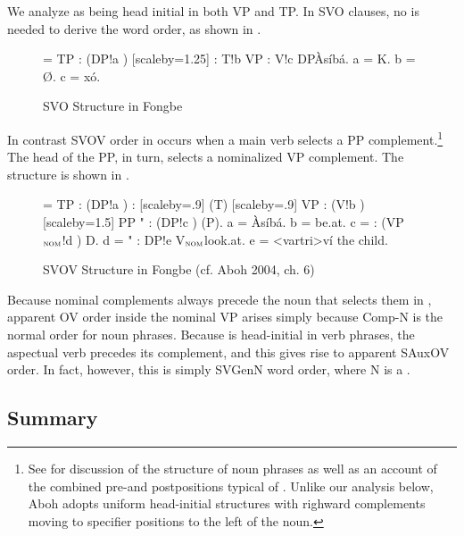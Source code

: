 \documentclass[output=paper]{LSP/langsci}
\begin{document}
We analyze  as being head initial in both VP and TP. In SVO clauses, no  is needed to derive the word order, as shown in . 

\begin{figure}
{\footnotesize \jtree[xunit=2.5em,yunit=1.25em]
\! = {TP}
: ({DP}!a ) [scaleby=1.25]
: {T}!b {VP}
: {V}!c {DP}{\`As\'ib\'a}.
\!a = {K}.
\!b = {\O{}}.
\!c = {x\'o}.
\endjtree}
\caption{SVO Structure in Fongbe}
\label{fig:sande:Fongbe-SAuxVO}
\end{figure}

In contrast SVOV order in  occurs when a main verb selects a PP complement.\footnote{See \citet{aboh10} for discussion of the structure of  noun phrases as well as an account of the combined pre-and postpositions typical of . Unlike our analysis below, Aboh adopts uniform head-initial structures with righward complements moving to specifier positions to the left of the noun.} The head of the PP, in turn, selects a nominalized VP complement. The structure is shown in . 


\begin{figure}
{\footnotesize \jtree[xunit=2.5em,yunit=1.25em]
\! = {TP}
: ({DP}!a )
: [scaleby=.9] ({T}) [scaleby=.9] {VP}
: ({V}!b ) [scaleby=1.5] {PP}
"{} : ({DP}!c ) ({P}{}).
\!a = {\`As\'ib\'a}.
\!b = {}{be.at}.
\!c = : ({VP$_{\textsc{nom}}$}!d ) {D}.
\!d = "{} : {DP}!e  {V$_{\textsc{nom}}$}{}{look.at}.
\!e = <vartri>{v\'i }{the child}.
\endjtree}
\caption{SVOV Structure in Fongbe (cf. Aboh 2004, ch. 6)}
\label{fig:sande:Fongbe-SVOV}
\end{figure}

Because nominal complements always precede the noun that selects them in  , apparent OV order inside the nominal VP arises simply because Comp-N is the normal order for noun phrases. Because  is head-initial in verb phrases, the aspectual verb precedes its complement, and this gives rise to apparent SAuxOV order. In fact, however, this is simply SVGenN word order, where N is a .

\subsection{Summary}
\end{document}
